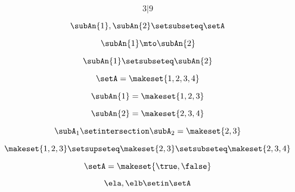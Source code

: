 \begin{forslides}
    \begin{equation}
        \label{eq:feedback-022}
        3 | 9
    \end{equation}

    \begin{equation}
        \label{eq:feedback-023}
        \subAn{1}, \subAn{2} \setsubseteq \setA
    \end{equation}

    \begin{equation}
        \label{eq:feedback-024}
        \subAn{1} \mto \subAn{2}
    \end{equation}

    \begin{equation}
        \label{eq:feedback-025}
        \subAn{1} \setsubseteq \subAn{2}
    \end{equation}

    \begin{equation}
        \label{eq:feedback-026}
        \setA = \makeset{ 1, 2, 3, 4 }
    \end{equation}

    \begin{equation}
        \label{eq:feedback-027}
        \subAn{1} = \makeset{ 1, 2, 3 }
    \end{equation}

    \begin{equation}
        \label{eq:feedback-028}
        \subAn{2} = \makeset{2, 3, 4 }
    \end{equation}

    \begin{equation}
        \label{eq:feedback-029}
        \subA_1 \setintersection \subA_2 = \makeset{2, 3 }
    \end{equation}

    \begin{equation}
        \label{eq:feedback-030}
        \makeset{ 1, 2, 3 } \setsupseteq \makeset{2, 3 } \setsubseteq \makeset{2, 3, 4 }
    \end{equation}

    \begin{equation}
        \label{eq:feedback-031}
        \setA = \makeset{ \true, \false }
    \end{equation}

    \begin{equation}
        \label{eq:feedback-032}
        \ela, \elb  \setin \setA
    \end{equation}


\end{forslides}
